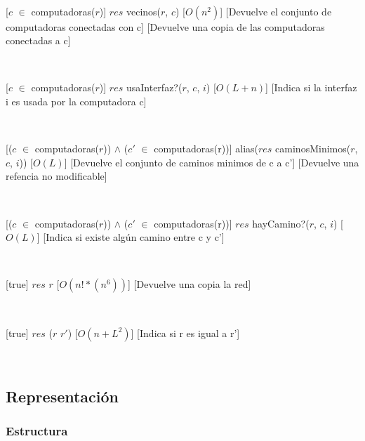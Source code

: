   ~

  [$c$ $\in$ computadoras($r$)]
  {$res$ \igobs vecinos($r$, $c$)}
  [$O(n^2)$]
  [Devuelve el conjunto de computadoras conectadas con c]
  [Devuelve una copia de las computadoras conectadas a c]

  ~

  [$c$ $\in$ computadoras($r$)]
  {$res$ \igobs usaInterfaz?($r$, $c$, $i$)}
  [$O(L + n)$]
  [Indica si la interfaz i es usada por la computadora c]

  ~

  [($c$ $\in$ computadoras($r$)) $\land$ ($c'$ $\in$ computadoras(r))]
  {alias($res$ \igobs caminosMinimos($r$, $c$, $i$))}
  [$O(L)$]
  [Devuelve el conjunto de caminos minimos de c a c']
  [Devuelve una refencia no modificable]


  ~

  [($c$ $\in$ computadoras($r$)) $\land$ ($c'$ $\in$ computadoras(r))]
  {$res$ \igobs hayCamino?($r$, $c$, $i$)}
  [$O(L)$]
  [Indica si existe algún camino entre c y c']

  ~

  [true]
  {$res$ \igobs $r$}
  [$O(n!*(n^6))$]
  [Devuelve una copia la red]

  ~

  [true]
  {$res$ \igobs ($r$ \igobs $r'$)}
  [$O(n +L^2)$]
  [Indica si r es igual a r']

  ~


\subsection{Representación}

  \subsubsection{Estructura}

